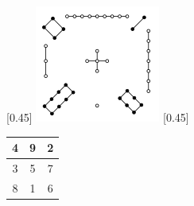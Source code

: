 \documentclass[UTF8]{article}
\begin{document}
\begin{figure}[htbp]
 \centering
 [0.45\linewidth]{ \includegraphics[scale=0.8]{img/luo-shu.png}}
 [0.45\linewidth]{
   \begin{tabular}{|c|c|c|}
   \hline
   4 & 9 & 2 \\
   \hline
   3 & 5 & 7 \\
   \hline
   8 & 1 & 6 \\
   \hline
   \end{tabular}
   \vspace{8mm}
 }
 \captionsetup{labelformat=empty}
 \caption{}
 \label{fig:luo-shu}
\end{figure}

\ifx\wholebook\relax \else

\expandafter\enddocument

\fi
\end{document}
